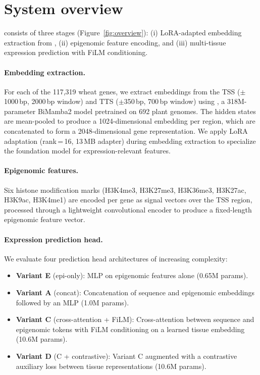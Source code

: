 \section{System overview}\label{sec:approach}

\mytool consists of three stages (Figure~\ref{fig:overview}): (i) LoRA-adapted embedding extraction from \botanic, (ii) epigenomic feature encoding, and (iii) multi-tissue expression prediction with FiLM conditioning.

\paragraph{Embedding extraction.}
For each of the 117,319 wheat genes, we extract embeddings from the TSS ($\pm$1000\,bp, 2000\,bp window) and TTS ($\pm$350\,bp, 700\,bp window) using \botanic, a 318M-parameter BiMamba2 model pretrained on 692 plant genomes. The hidden states are mean-pooled to produce a 1024-dimensional embedding per region, which are concatenated to form a 2048-dimensional gene representation. We apply LoRA adaptation (rank\,=\,16, 13\,MB adapter) during embedding extraction to specialize the foundation model for expression-relevant features.

\paragraph{Epigenomic features.}
Six histone modification marks (H3K4me3, H3K27me3, H3K36me3, H3K27ac, H3K9ac, H3K4me1) are encoded per gene as signal vectors over the TSS region, processed through a lightweight convolutional encoder to produce a fixed-length epigenomic feature vector.

\paragraph{Expression prediction head.}
We evaluate four prediction head architectures of increasing complexity:
\begin{itemize}
\item \textbf{Variant E} (epi-only): MLP on epigenomic features alone (0.65M params).
\item \textbf{Variant A} (concat): Concatenation of sequence and epigenomic embeddings followed by an MLP (1.0M params).
\item \textbf{Variant C} (cross-attention + FiLM): Cross-attention between sequence and epigenomic tokens with FiLM conditioning on a learned tissue embedding (10.6M params).
\item \textbf{Variant D} (C + contrastive): Variant C augmented with a contrastive auxiliary loss between tissue representations (10.6M params).
\end{itemize}

